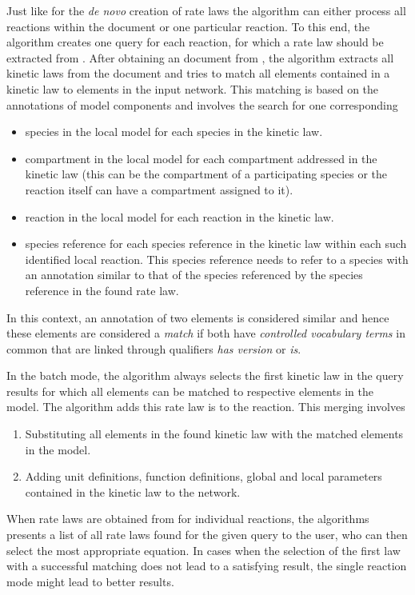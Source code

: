 Just like for the \emph{de novo} creation of rate laws the algorithm can either process all reactions within the \SBML document or one particular reaction.
To this end, the algorithm creates one query \URL for each reaction, for which a rate law should be extracted from \SABIO.
After obtaining an \SBML document from \SABIO, the algorithm extracts all kinetic laws from the \SBML document and tries to match all elements contained in a kinetic law to elements in the input network. 
This matching is based on the \MIRIAM annotations of model components and involves the search for one corresponding
\begin{itemize}
  \item species in the local model for each species in the kinetic law.
  \item compartment in the local model for each compartment addressed in the kinetic law (this can be the compartment of a participating species or the reaction itself can have a compartment assigned to it).
  \item reaction in the local model for each reaction in the kinetic law.
  \item species reference for each species reference in the kinetic law within each such identified local reaction. 
This species reference needs to refer to a species with an annotation similar to that of the species referenced by the species reference in the found rate law.
\end{itemize}
In this context, an annotation of two \SBML elements is considered similar and hence these elements are considered a \emph{match} if both have \emph{controlled vocabulary terms} in common that are linked through qualifiers \emph{has version} or \emph{is}.

In the batch mode, the algorithm always selects the first kinetic law in the query results for which all elements can be matched to respective elements in the model.
The algorithm adds this rate law is to the reaction.
This merging involves
\begin{enumerate}
  \item Substituting all elements in the found kinetic law with the matched elements in the model.
  \item Adding unit definitions, function definitions, global and local parameters contained in the kinetic law to the network.
\end{enumerate}

When rate laws are obtained from \SABIO for individual reactions, the algorithms presents a list of all rate laws found for the given query to the user, who can then select the most appropriate equation.
In cases when the selection of the first law with a successful matching does not lead to a satisfying result, the single reaction mode might lead to better results.


